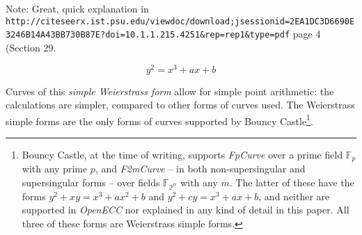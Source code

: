 Note: Great, quick explanation in \verb+http://citeseerx.ist.psu.edu/viewdoc/download;jsessionid=2EA1DC3D6690E3246B14A43BB730B87E?doi=10.1.1.215.4251&rep=rep1&type=pdf+ page 4 (Section 29.

\begin{equation}
	y^2 = x^3 + ax + b
\end{equation}

Curves of this \emph{simple Weierstrass form} allow for simple point arithmetic: the
calculations are simpler, compared to other forms of curves used. The Weierstrass simple forms are
the only forms of curves supported by Bouncy Castle\footnote{Bouncy Castle, at the time of writing,
supports \emph{FpCurve} over a prime field \(\mathbb{F}_p\) with any prime \(p\), and \emph{F2mCurve}
-- in both non-supersingular and supersingular forms -- over fields \(\mathbb{F_{2^m}}\) with any \(m\).
The latter of these have the forms \(y^2 + xy = x^3 + ax^2 + b\) and
\(y^2 + cy = x^3 + ax + b\), and neither are supported in \emph{OpenECC} nor explained in any kind
of detail in this paper. All three of these forms are Weierstrass simple forms.}.
